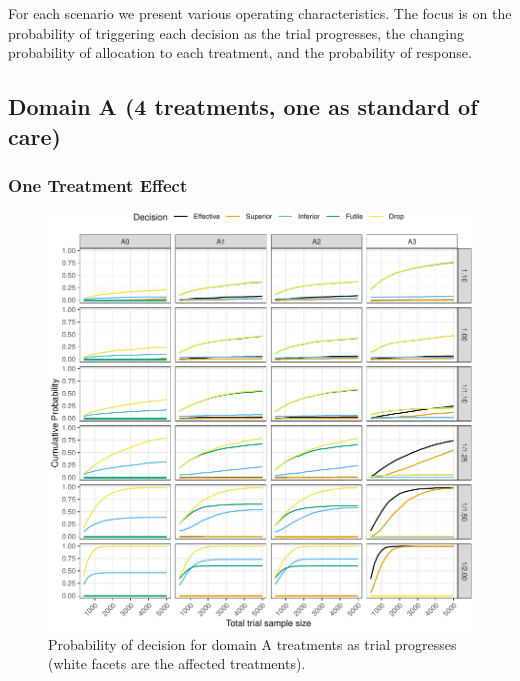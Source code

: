 \documentclass[
]{article}
\begin{document}
For each scenario we present various operating characteristics.
The focus is on the probability of triggering each decision as the trial progresses, the changing probability of allocation to each treatment, and the probability of response.

\hypertarget{domain-a-4-treatments-one-as-standard-of-care}{%
\subsection{Domain A (4 treatments, one as standard of care)}\label{domain-a-4-treatments-one-as-standard-of-care}}

\hypertarget{one-treatment-effect}{%
\subsubsection{One Treatment Effect}\label{one-treatment-effect}}

\begin{figure}
\centering
\includegraphics{ASCOT_simulations_5_files/figure-latex/unnamed-chunk-2-1.pdf}
\caption{\label{fig:unnamed-chunk-2}Probability of decision for domain A treatments as trial progresses (white facets are the affected treatments).}
\end{figure}
\end{document}

